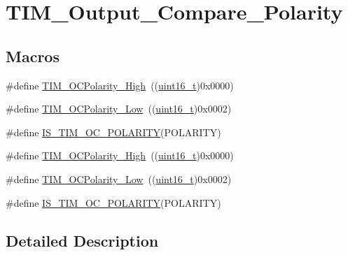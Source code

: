 \hypertarget{group___t_i_m___output___compare___polarity}{}\section{T\+I\+M\+\_\+\+Output\+\_\+\+Compare\+\_\+\+Polarity}
\label{group___t_i_m___output___compare___polarity}
\subsection*{Macros}
\begin{DoxyCompactItemize}
\item 
\#define \hyperlink{group___t_i_m___output___compare___polarity_gaba2f2de6fd722b8973e0eddeb8644022}{T\+I\+M\+\_\+\+O\+C\+Polarity\+\_\+\+High}~((\hyperlink{_p_e___types_8h_a1f1825b69244eb3ad2c7165ddc99c956}{uint16\+\_\+t})0x0000)
\item 
\#define \hyperlink{group___t_i_m___output___compare___polarity_ga9f4b11953dbd2c6f836b6913469dcf54}{T\+I\+M\+\_\+\+O\+C\+Polarity\+\_\+\+Low}~((\hyperlink{_p_e___types_8h_a1f1825b69244eb3ad2c7165ddc99c956}{uint16\+\_\+t})0x0002)
\item 
\#define \hyperlink{group___t_i_m___output___compare___polarity_ga1c2ee68d587d4f48d935c82fe4c3fe1e}{I\+S\+\_\+\+T\+I\+M\+\_\+\+O\+C\+\_\+\+P\+O\+L\+A\+R\+I\+TY}(P\+O\+L\+A\+R\+I\+TY)
\item 
\#define \hyperlink{group___t_i_m___output___compare___polarity_gaba2f2de6fd722b8973e0eddeb8644022}{T\+I\+M\+\_\+\+O\+C\+Polarity\+\_\+\+High}~((\hyperlink{_p_e___types_8h_a1f1825b69244eb3ad2c7165ddc99c956}{uint16\+\_\+t})0x0000)
\item 
\#define \hyperlink{group___t_i_m___output___compare___polarity_ga9f4b11953dbd2c6f836b6913469dcf54}{T\+I\+M\+\_\+\+O\+C\+Polarity\+\_\+\+Low}~((\hyperlink{_p_e___types_8h_a1f1825b69244eb3ad2c7165ddc99c956}{uint16\+\_\+t})0x0002)
\item 
\#define \hyperlink{group___t_i_m___output___compare___polarity_ga1c2ee68d587d4f48d935c82fe4c3fe1e}{I\+S\+\_\+\+T\+I\+M\+\_\+\+O\+C\+\_\+\+P\+O\+L\+A\+R\+I\+TY}(P\+O\+L\+A\+R\+I\+TY)
\end{DoxyCompactItemize}


\subsection{Detailed Description}


